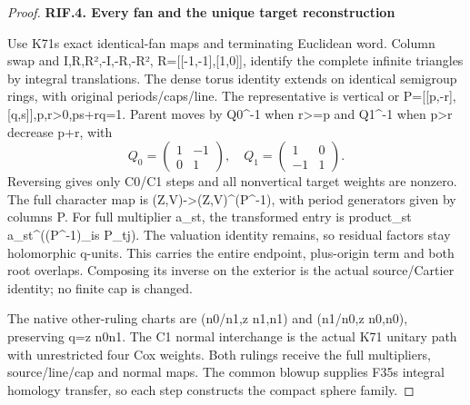 \begin{proof}
\par

\medskip\noindent\textbf{RIF.4. Every fan and the unique target reconstruction}

\par\nobreak

Use K71\textquotesingle s exact identical-fan maps and terminating Euclidean word.
Column swap and I,R,R²,-I,-R,-R², R={[}{[}-1,-1{]},{[}1,0{]}{]}, identify
the complete infinite triangles by integral translations. The dense
torus identity extends on identical semigroup rings, with original
periods/caps/line. The representative is vertical or
P={[}{[}p,-r{]},{[}q,s{]}{]},p,r\textgreater0,ps+rq=1. Parent moves by Q0\^{}-1 when r\textgreater=p
and Q1\^{}-1 when p\textgreater r decrease p+r, with
\[
Q_0=\begin{pmatrix}1&-1\\0&1\end{pmatrix},\quad
Q_1=\begin{pmatrix}1&0\\-1&1\end{pmatrix}.
\tag{RIF.10}
\]
Reversing gives only C0/C1 steps and all nonvertical target weights
are nonzero. The full character map is (Z,V)-\textgreater(Z,V)\^{}(P\^{}-1), with
period generators given by columns P. For full multiplier a\_st,
the transformed entry is product\_st a\_st\^{}((P\^{}-1)\_is P\_tj).
The valuation identity remains, so residual factors stay holomorphic
q-units. This carries the entire endpoint, plus-origin term and
both root overlaps. Composing its inverse on the exterior is the
actual source/Cartier identity; no finite cap is changed.

The native other-ruling charts are (n0/n1,z n1,n1) and
(n1/n0,z n0,n0), preserving q=z n0n1. The C1 normal interchange
is the actual K71 unitary path with unrestricted four Cox weights.
Both rulings receive the full multipliers, source/line/cap and normal
maps. The common blowup supplies F35\textquotesingle s integral homology transfer,
so each step constructs the compact sphere family.


\end{proof}
